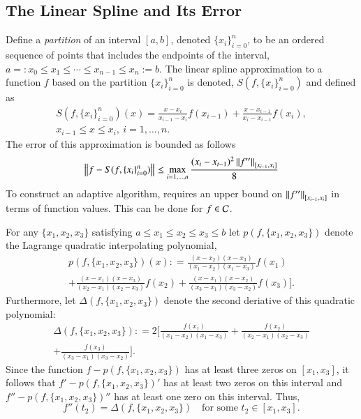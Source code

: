 \documentclass[review]{elsarticle}
\newcommand{\datasites}{\{x_i\}_{i=0}^n}
\begin{document}
\subsection{The Linear Spline and Its Error}
Define a \emph{partition} of an interval $[a, b]$, denoted $\datasites$, to be an ordered sequence of points that includes the endpoints of the interval,  $a=:x_0 \le x_1 \le \cdots \le x_{n-1} \le x_{n}:=b$.   The linear spline approximation to a function $f$ based on the partition $\datasites$ is denoted, $S(f,\datasites)$ and defined as
\begin{multline} \label{splinedef}
S(f,\datasites)(x) =  \frac{x-x_i}{x_{i-1} - x_i} f(x_{i-1}) + \frac{x-x_{i-1}}{x_{i} - x_{i-1}}f(x_i), \\ x_{i-1} \le x \le x_i, \ i=1, \ldots, n.
\end{multline}
The error of this approximation is bounded as follows
\begin{equation} \label{appxerrbda}
\norm{f - S(f,\datasites)} \le \max_{i=1, \ldots, n} \frac{(x_i - x_{i-1})^2\norm[{[x_{i-1},x_i]}]{f''}}{8}
\end{equation}
To construct an adaptive algorithm, requires an upper bound on $\norm[{[x_{i-1},x_i]}]{f''}$ in terms of function values.  This can be done for $f \in \cc$.

For any $\{x_1, x_2, x_3\}$ satisfying $a \le x_1 \le x_2 \le x_3 \le b$ let  $p(f,\{x_1, x_2, x_3\})$ denote the Lagrange quadratic interpolating polynomial,
\begin{multline*} 
p(f,\{x_1, x_2, x_3\})(x) : = \frac{(x-x_2)(x-x_3)}{(x_1-x_2)(x_1 - x_3)}f(x_1) \\ + \frac{(x-x_1)(x-x_3)}{(x_2-x_1)(x_2 - x_3)}f(x_2) + \frac{(x-x_1)(x-x_2)}{(x_3-x_1)(x_3 - x_2)}f(x_3) \biggr ].
\end{multline*}
Furthermore, let $\Delta(f,\{x_1, x_2, x_3\})$ denote the second deriative of this quadratic polynomial: 
\begin{multline} \label{Deltadef}
\Delta(f,\{x_1, x_2, x_3\}) : = 2 \biggl[ \frac{f(x_1)}{(x_1-x_2)(x_1 - x_3)} + \frac{f(x_2)}{(x_2-x_1)(x_2 - x_3)} \\
+ \frac{f(x_3)}{(x_3-x_1)(x_3 - x_2)} \biggr ].
\end{multline}
Since the function $f - p(f,\{x_1, x_2, x_3\})$ has at least three zeros on $[x_1, x_3]$, it follows that $f' - p(f,\{x_1, x_2, x_3\})'$ has at least two zeros on this interval and $f'' - p(f,\{x_1, x_2, x_3\})''$ has at least one zero on this interval.  Thus, 
\begin{equation} \label{fppDeltaa}
f''(t_2) = \Delta(f,\{x_1, x_2, x_3\}) \quad \text{for some } t_2 \in [x_1, x_3].
\end{equation}
\end{document}
